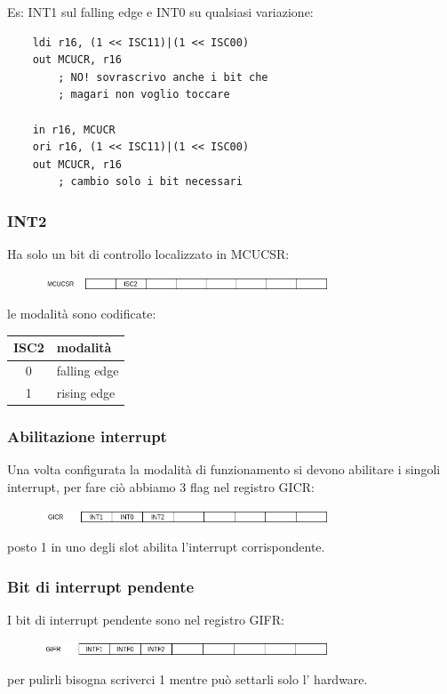 Es: INT1 sul falling edge e INT0 su qualsiasi variazione:
\begin{verbatim}
    ldi r16, (1 << ISC11)|(1 << ISC00)
    out MCUCR, r16
        ; NO! sovrascrivo anche i bit che
        ; magari non voglio toccare
    
    in r16, MCUCR
    ori r16, (1 << ISC11)|(1 << ISC00)
    out MCUCR, r16
        ; cambio solo i bit necessari
\end{verbatim}

\subsubsection{INT2}
Ha solo un bit di controllo localizzato in MCUCSR:
\begin{figure}[H]
    \centering
    \includegraphics[width=320px]{images/15_Interrupt/MCUCSR.png}
\end{figure}
le modalità sono codificate:
\begin{table}[ht!]
    \centering
    \begin{tabular}{c|l}
        ISC2 & modalità \\
        \hline
        0 & falling edge \\
        1 & rising edge \\
    \end{tabular}
\end{table}

\subsubsection{Abilitazione interrupt}
Una volta configurata la modalità di funzionamento si devono abilitare i singoli interrupt, per fare ciò abbiamo 3 flag nel registro GICR:
\begin{figure}[H]
    \centering
    \includegraphics[width=320px]{images/15_Interrupt/GICR.png}
\end{figure}
posto 1 in uno degli slot abilita l'interrupt corrispondente.

\subsubsection{Bit di interrupt pendente}
I bit di interrupt pendente sono nel registro GIFR:
\begin{figure}[H]
    \centering
    \includegraphics[width=320px]{images/15_Interrupt/GIFR.png}
\end{figure}
per pulirli bisogna scriverci 1 mentre può settarli solo l' hardware.

